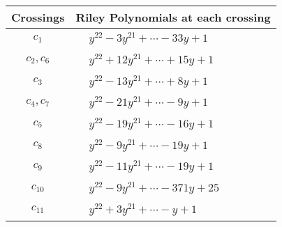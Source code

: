 \documentclass[1p]{elsarticle_modified}
\theoremstyle{definition}
\begin{document}
\begin{tabular}{m{50pt}|m{274pt}}
Crossings & \hspace{64pt}Riley Polynomials at each crossing \\
\hline $$\begin{aligned}c_{1}\end{aligned}$$&$\begin{aligned}
&y^{22}-3 y^{21}+\cdots-33 y+1
\end{aligned}$\\
\hline $$\begin{aligned}c_{2},c_{6}\end{aligned}$$&$\begin{aligned}
&y^{22}+12 y^{21}+\cdots+15 y+1
\end{aligned}$\\
\hline $$\begin{aligned}c_{3}\end{aligned}$$&$\begin{aligned}
&y^{22}-13 y^{21}+\cdots+8 y+1
\end{aligned}$\\
\hline $$\begin{aligned}c_{4},c_{7}\end{aligned}$$&$\begin{aligned}
&y^{22}-21 y^{21}+\cdots-9 y+1
\end{aligned}$\\
\hline $$\begin{aligned}c_{5}\end{aligned}$$&$\begin{aligned}
&y^{22}-19 y^{21}+\cdots-16 y+1
\end{aligned}$\\
\hline $$\begin{aligned}c_{8}\end{aligned}$$&$\begin{aligned}
&y^{22}-9 y^{21}+\cdots-19 y+1
\end{aligned}$\\
\hline $$\begin{aligned}c_{9}\end{aligned}$$&$\begin{aligned}
&y^{22}-11 y^{21}+\cdots-19 y+1
\end{aligned}$\\
\hline $$\begin{aligned}c_{10}\end{aligned}$$&$\begin{aligned}
&y^{22}-9 y^{21}+\cdots-371 y+25
\end{aligned}$\\
\hline $$\begin{aligned}c_{11}\end{aligned}$$&$\begin{aligned}
&y^{22}+3 y^{21}+\cdots- y+1
\end{aligned}$\\
\hline
\end{tabular}\\~\\
\end{document}
